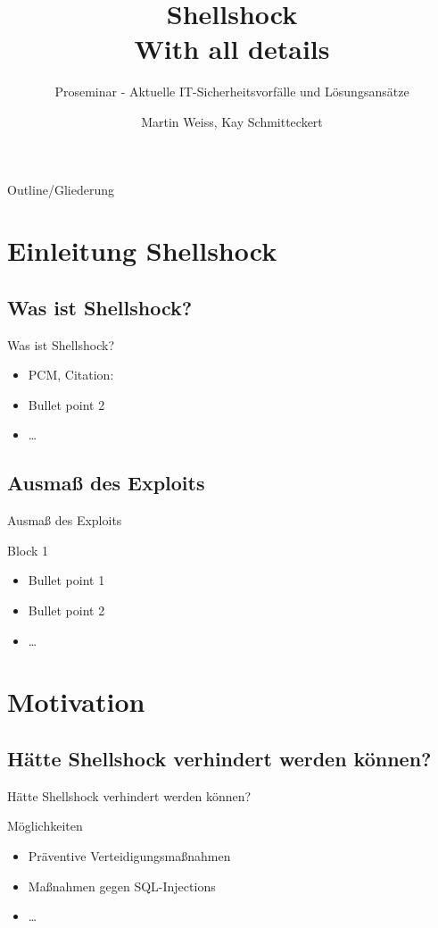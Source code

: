 \documentclass[18pt]{beamer}
\title[Short title]{Shellshock\\ With all details}
\subtitle{Proseminar - Aktuelle IT-Sicherheitsvorfälle und Lösungsansätze}
\author{Martin Weiss, Kay Schmitteckert}
\institute{Chair for Software Design and Quality}
\begin{document}

\begin{frame}
\titlepage
\end{frame}

\begin{frame}{Outline/Gliederung}
\tableofcontents
\end{frame}

\section{Einleitung Shellshock}

\subsection{Was ist Shellshock?}
\begin{frame}{Was ist Shellshock?}
\begin{itemize}
\item PCM, Citation: \cite{becker2008a} %
\pause
\item Bullet point 2
\item \dots
\end{itemize}
\end{frame}

\subsection{Ausmaß des Exploits}
\begin{frame}{Ausmaß des Exploits}
\begin{block}{Block 1}
\begin{itemize}
\item Bullet point 1
\pause
\item Bullet point 2
\item \dots
\end{itemize}
\end{block}
\end{frame}

\section{Motivation}
\subsection{Hätte Shellshock verhindert werden können?}
\begin{frame}{Hätte Shellshock verhindert werden können?}
\begin{exampleblock}{Möglichkeiten}
\begin{itemize}
\item Präventive Verteidigungsmaßnahmen
\pause
\item Maßnahmen gegen SQL-Injections
\item \dots
\end{itemize}
\end{exampleblock}
\end{frame}
\end{document}

